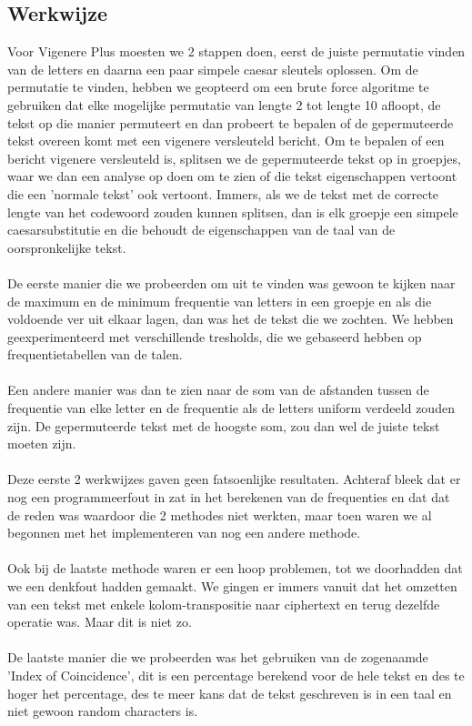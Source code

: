 \documentclass{article}
\begin{document}
\subsection{Werkwijze}
Voor Vigenere Plus moesten we 2 stappen doen, eerst de juiste permutatie vinden van de letters en daarna een paar simpele caesar sleutels oplossen. Om de permutatie te vinden, hebben we geopteerd om een brute force algoritme te gebruiken dat elke mogelijke permutatie van lengte 2 tot lengte 10 afloopt, de tekst op die manier permuteert en dan probeert te bepalen of de gepermuteerde tekst overeen komt met een vigenere versleuteld bericht. Om te bepalen of een bericht vigenere versleuteld is, splitsen we de gepermuteerde tekst op in groepjes, waar we dan een analyse op doen om te zien of die tekst eigenschappen vertoont die een 'normale tekst' ook vertoont. Immers, als we de tekst met de correcte lengte van het codewoord zouden kunnen splitsen, dan is elk groepje een simpele caesarsubstitutie en die behoudt de eigenschappen van de taal van de oorspronkelijke tekst. \\ \\
De eerste manier die we probeerden om uit te vinden was gewoon te kijken naar de maximum en de minimum frequentie van letters in een groepje en als die voldoende ver uit elkaar lagen, dan was het de tekst die we zochten. We hebben geexperimenteerd met verschillende tresholds, die we gebaseerd hebben op frequentietabellen van de talen. \\ \\
Een andere manier was dan te zien naar de som van de afstanden tussen de frequentie van elke letter en de frequentie als de letters uniform verdeeld zouden zijn. De gepermuteerde tekst met de hoogste som, zou dan wel de juiste tekst moeten zijn. \\ \\
Deze eerste 2 werkwijzes gaven geen fatsoenlijke resultaten. Achteraf bleek dat er nog een programmeerfout in zat in het berekenen van de frequenties en dat dat de reden was waardoor die 2 methodes niet werkten, maar toen waren we al begonnen met het implementeren van nog een andere methode. \\ \\
Ook bij de laatste methode waren er een hoop problemen, tot we doorhadden dat we een denkfout hadden gemaakt. We gingen er immers vanuit dat het omzetten van een tekst met enkele kolom-transpositie naar ciphertext en terug dezelfde operatie was. Maar dit is niet zo. \\ \\
De laatste manier die we probeerden was het gebruiken van de zogenaamde 'Index of Coincidence', dit is een percentage berekend voor de hele tekst en des te hoger het percentage, des te meer kans dat de tekst geschreven is in een taal en niet gewoon random characters is. \\ \\
\end{document}
